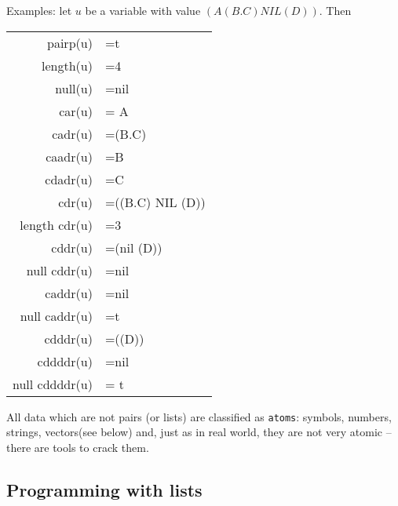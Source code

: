 {\nopagebreak[3]
Examples: let $u$ be a variable with value $(A (B.C) NIL (D))$.  Then
\begin{center}
\begin{tabular}{rl}
  pairp(u)   &=t\\ 
  length(u)  &=4\\
  null(u)    &=nil\\
  car(u)     & = A\\
  cadr(u)    &=(B.C)\\
  caadr(u)   &=B\\
  cdadr(u)   &=C\\
  cdr(u)     &=((B.C) NIL (D))\\
  length cdr(u)&=3\\
  cddr(u)    &=(nil (D))\\
  null cddr(u) &=nil\\
  caddr(u)     &=nil\\
  null caddr(u)&=t\\
  cdddr(u)   &=((D))\\
  cddddr(u)  &=nil\\
  null cddddr(u)  &= t\\
\end{tabular}
\end{center}
}

All data which are not pairs (or lists) are classified
as {\tt atoms}: symbols, numbers, strings, vectors(see below)
and, just as in real world, they are not very atomic -- there
are tools to crack them.

\subsection{Programming with lists}

